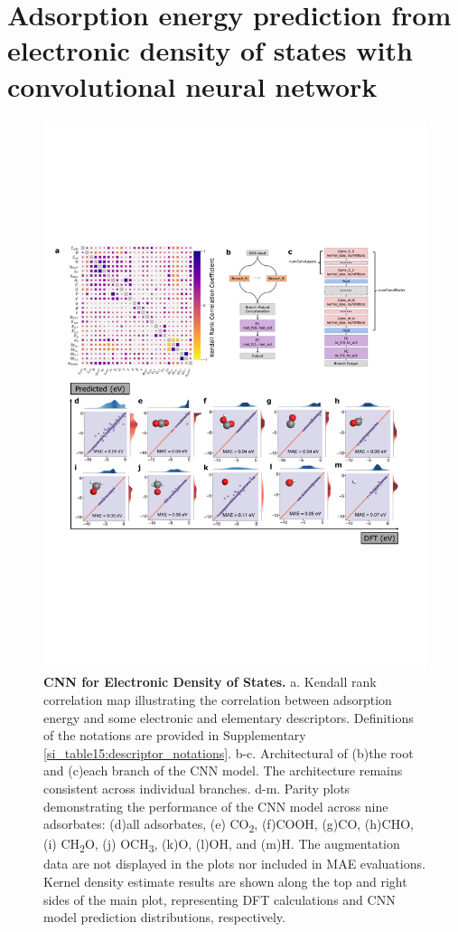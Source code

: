 

\section{Adsorption energy prediction from electronic density of states with convolutional neural network}


\begin{figure}
    \centering
    \includegraphics[width=0.7\linewidth]{main_fig2_cnn.JPG}
    \caption{\textbf{CNN for Electronic Density of States.}
    a. Kendall rank correlation map illustrating the correlation between adsorption energy
    and some electronic and elementary descriptors.
    Definitions of the notations are provided in Supplementary \cref{si_table15:descriptor_notations}.
    b-c. Architectural of (b)the root and (c)each branch of the CNN model.
    The architecture remains consistent across individual branches.
    d-m. Parity plots demonstrating the performance of the CNN model across nine adsorbates:
    (d)all adsorbates, (e) CO\textsubscript{2}, (f)COOH, (g)CO, (h)CHO, (i) CH\textsubscript{2}O, (j) OCH\textsubscript{3}, (k)O, (l)OH, and (m)H.
    The augmentation data are not displayed in the plots nor included in MAE evaluations.
    Kernel density estimate results are shown along the top and right sides of the main plot,
    representing DFT calculations and CNN model prediction distributions, respectively.}
    \label{main_fig2:cnn_for_eads}
\end{figure}


